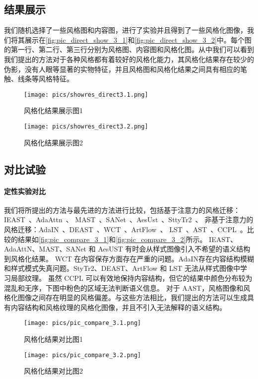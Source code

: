 \subsection{结果展示}
我们随机选择了一些风格图和内容图，进行了实验并且得到了一些风格化图像，我们将其展示在\autoref{fig:pic_direct_show_3_1}和\autoref{fig:pic_direct_show_3_2}中。每个图的第一行、第二行、第三行分别为风格图、内容图和风格化图。从中我们可以看到我们提出的方法对于各种风格都有着较好的风格化能力，其风格化结果存在较少的伪影，没有人眼等显著的实物特征，并且风格图和风格化结果之间具有相应的笔触、线条等风格特征。

\begin{figure}[htbp]
    \centering
    \texttt{[image: pics/showres\_direct3.1.png]}
    \caption{\label{fig:pic_direct_show_3_1}风格化结果展示图1}
\end{figure}
\begin{figure}[htbp]
    \centering
    \texttt{[image: pics/showres\_direct3.2.png]}
    \caption{\label{fig:pic_direct_show_3_2}风格化结果展示图2}
\end{figure}
\subsection{对比试验}
\paragraph{定性实验对比}
我们将所提出的方法与最先进的方法进行比较，包括基于注意力的风格迁移：IEAST~\cite{chen2021artistic}、AdaAttn~\cite{liu2021adaattn}、
MAST~\cite{deng2020arbitrary}、SANet~\cite{park2019arbitrary}、AesUst~\cite{wang2022aesust}、SttyTr2~\cite{deng2022stytr2}、
非基于注意力的风格迁移：AdaIN~\cite{huang2017arbitrary}、DEAST~\cite{zhang2022domain}、WCT~\cite{li2017universal}、ArtFlow~\cite{an2021artflow}、
LST~\cite{li2019learning}、AST~\cite{hu2020aesthetic}、CCPL~\cite{wu2022ccpl}。比较的结果如\autoref{fig:pic_compare_3_1}和\autoref{fig:pic_compare_3_2}所示。
IEAST、AdaAttN、MAST、SANet 和 AesUST 有时会从样式图像引入不希望的语义结构到风格化结果。
WCT 在内容保存方面存在严重的问题。AdaIN存在内容结构模糊和样式模式失真问题。StyTr2、DEAST、ArtFlow 和 LST 无法从样式图像中学习局部纹理。
虽然 CCPL 可以有效地保持内容结构，但它的结果中颜色分布较为混乱和无序，下图中粉色的区域无法判断语义信息。
对于 AAST，风格图像和风格化图像之间存在明显的风格偏差。与这些方法相比，我们提出的方法可以生成具有内容结构和风格纹理的风格化图像，并且不引入无法解释的语义结构。
\begin{figure}[htbp]
    \centering
    \texttt{[image: pics/pic\_compare\_3.1.png]}
    \caption{\label{fig:pic_compare_3_1}风格化结果对比图1}
\end{figure}
\begin{figure}[htbp]
    \centering
    \texttt{[image: pics/pic\_compare\_3.2.png]}
    \caption{\label{fig:pic_compare_3_2}风格化结果对比图2}
\end{figure}

